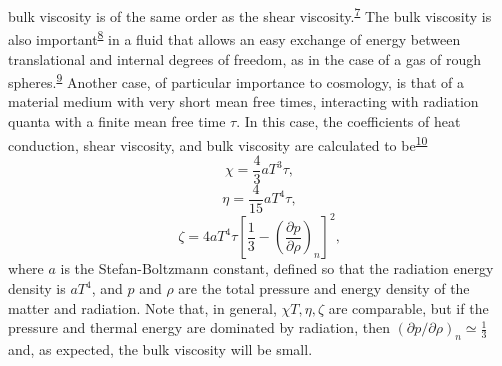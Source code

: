 bulk viscosity is of the same order as the shear
viscosity.\textsuperscript{\hyperref[ch2-ref-7]{7}} The bulk viscosity is also
important\textsuperscript{\hyperref[ch2-ref-8]{8}} in a fluid that allows an
easy exchange of energy between translational and internal degrees of freedom,
as in the case of a gas of rough
spheres.\textsuperscript{\hyperref[ch2-ref-9]{9}} Another case, of particular
importance to cosmology, is that of a material medium with very short mean free
times, interacting with radiation quanta with a finite mean free time \(\tau\).
In this case, the coefficients of heat conduction, shear viscosity, and bulk
viscosity are calculated to be\textsuperscript{\hyperref[ch2-ref-10]{10}}
\begin{equation}
  \chi=\frac43aT^3\tau ,
  \tag{2.11.26}\label{eq:2.11.26}
\end{equation}
\begin{equation}
  \eta=\frac4{15}aT^4\tau ,
  \tag{2.11.27}\label{eq:2.11.27}
\end{equation}
\begin{equation}
  \zeta=4aT^4\tau
  \left[
    \frac13-\left(\frac{\partial p}{\partial\rho}\right)_n
  \right]^2,
  \tag{2.11.28}\label{eq:2.11.28}
\end{equation}
where \(a\) is the Stefan-Boltzmann constant, defined so that the radiation
energy density is \(aT^4\), and \(p\) and \(\rho\) are the total pressure and
energy density of the matter and radiation. Note that, in general,
\(\chi T,\eta,\zeta\) are comparable, but if the pressure and thermal energy
are dominated by radiation, then
\((\partial p/\partial\rho)_n\simeq\tfrac13\) and, as expected, the bulk
viscosity will be small.
